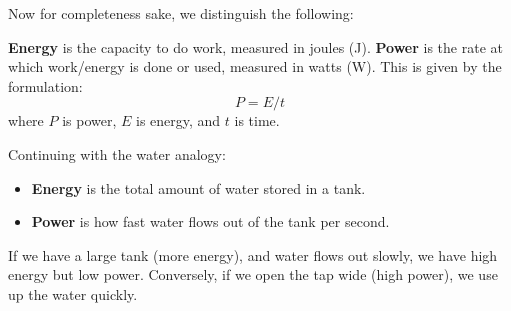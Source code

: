\newpage 

\noindent
Now for completeness sake, we distinguish the following:

\begin{Def}

    \label{def:energy_power}

    \noindent
    \textbf{Energy} is the capacity to do work, measured in joules (J). 
    \textbf{Power} is the rate at which work/energy is done or used, measured in watts (W).
    \noindent
    This is given by the formulation:
    \[
        P = E / t
    \]
    where $P$ is power, $E$ is energy, and $t$ is time.
\end{Def}

\noindent
\begin{Example}

    \noindent
    Continuing with the water analogy:
    \begin{itemize}
        \item \textbf{Energy} is the total amount of water stored in a tank.
        \item \textbf{Power} is how fast water flows out of the tank per second.
    \end{itemize}
    \noindent
    If we have a large tank (more energy), and water flows out slowly, we have high energy but low power. 
    Conversely, if we open the tap wide (high power), we use up the water quickly.

   
\end{Example}

